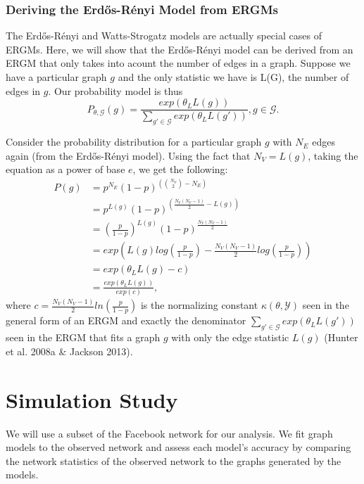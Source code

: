 \documentclass[12pt,twoside]{amherstthesis}
\begin{document}
  \subsection{Deriving the Erdős-Rényi Model from
  ERGMs}\label{deriving-the-erdos-renyi-model-from-ergms}
  
  The Erdős-Rényi and Watts-Strogatz models are actually special cases of
  ERGMs. Here, we will show that the Erdős-Rényi model can be derived from
  an ERGM that only takes into acount the number of edges in a graph.
  Suppose we have a particular graph \(g\) and the only statistic we have
  is L(G), the number of edges in \(g\). Our probability model is thus
  \[P_{\theta, \mathcal{G}}(g) = \frac {exp(\theta_{L}L(g))} {\sum_{g' \in \mathcal{G}}^{} exp(\theta_{L}L(g'))}, g \in \mathcal{G}.\]
  
  Consider the probability distribution for a particular graph \(g\) with
  \(N_E\) edges again (from the Erdős-Rényi model). Using the fact that
  \(N_{V} = L(g)\), taking the equation as a power of base \(e\), we get
  the following: \[
  \begin{aligned}
  P(g) &= p^{N_E}(1 - p)^{\left({N_V \choose 2} - N_E \right)} \\
  &= p^{L(g)}(1 - p)^{\left(\frac {N_{V}(N_{V} - 1)} {2} - L(g) \right)} \\
  &= \left( \frac {p} {1-p} \right)^{L(g)}(1 - p)^{\frac {N_{V}(N_{V} - 1)} {2}} \\
  &= exp \left(L(g)log \left(\frac {p} {1-p} \right) - \frac {N_{V}(N_{V} - 1)} {2} log \left( \frac {p} {1-p} \right) \right) \\
  &= exp(\theta_{L}L(g) - c) \\
  &= \frac {exp(\theta_{L}L(g))} {exp(c)},
  \end{aligned} 
  \] where
  \(c = \frac {N_{V}(N_{V} - 1)} {2} ln \left( \frac {p} {1-p} \right)\)
  is the normalizing constant \(\kappa(\theta, \mathcal{Y})\) seen in the
  general form of an ERGM and exactly the denominator
  \(\sum_{g' \in \mathcal{G}}^{} exp(\theta_{L}L(g'))\) seen in the ERGM
  that fits a graph \(g\) with only the edge statistic \(L(g)\) (Hunter et
  al. 2008a \& Jackson 2013).
  
  \chapter{Simulation Study}\label{simulation-study}
  
  We will use a subset of the Facebook network for our analysis. We fit
  graph models to the observed network and assess each model's accuracy by
  comparing the network statistics of the observed network to the graphs
  generated by the models.
  
\end{document}
